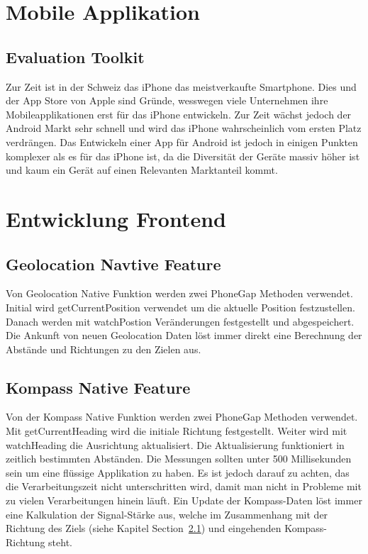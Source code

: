 \section{Mobile Applikation} %
\label{sec:Mobile Applikation}

\subsection{Evaluation Toolkit} %
\label{sub:Evaluation Toolkit}
Zur Zeit ist in der Schweiz das iPhone das meistverkaufte Smartphone. Dies und der App Store von Apple sind Gründe, wesswegen viele Unternehmen ihre Mobileapplikationen erst für das iPhone entwickeln. Zur Zeit wächst jedoch der Android Markt sehr schnell und wird das iPhone wahrscheinlich vom ersten Platz verdrängen. Das Entwickeln einer App für Android ist jedoch in einigen Punkten komplexer als es für das iPhone ist, da die Diversität der Geräte massiv höher ist und kaum ein Gerät auf einen Relevanten Marktanteil kommt.

\section{Entwicklung Frontend} %
\label{sec:entwicklung_frontend}

\subsection{Geolocation Navtive Feature} %
\label{sub:geolocation_native_feature}
Von Geolocation Native Funktion werden zwei PhoneGap Methoden verwendet. Initial wird getCurrentPosition verwendet um die aktuelle Position festzustellen. Danach werden mit watchPostion Veränderungen festgestellt und abgespeichert. Die Ankunft von neuen Geolocation Daten löst immer direkt eine Berechnung der Abstände und Richtungen zu den Zielen aus.

\subsection{Kompass Native Feature} %
\label{sub:kompass_native_feature}
Von der Kompass Native Funktion werden zwei PhoneGap Methoden verwendet. Mit getCurrentHeading wird die initiale Richtung festgestellt. Weiter wird mit watchHeading die Ausrichtung aktualisiert. Die Aktualisierung funktioniert in zeitlich bestimmten Abständen. Die Messungen sollten unter 500 Millisekunden sein um eine flüssige Applikation zu haben. Es ist jedoch darauf zu achten, das die Verarbeitungszeit nicht unterschritten wird, damit man nicht in Probleme mit zu vielen Verarbeitungen hinein läuft. Ein Update der Kompass-Daten löst immer eine Kalkulation der Signal-Stärke aus, welche im Zusammenhang mit der Richtung des Ziels (siehe Kapitel  Section~\ref{sub:geolocation_native_feature}) und eingehenden Kompass-Richtung steht.

